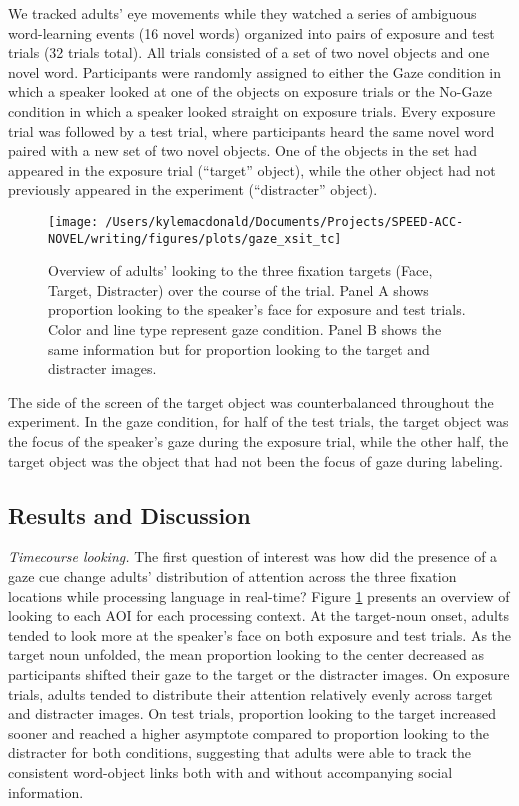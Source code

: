 \documentclass[oneside]{report}
\begin{document}
We tracked adults' eye movements while they watched a series of
ambiguous word-learning events (16 novel words) organized into pairs of
exposure and test trials (32 trials total). All trials consisted of a
set of two novel objects and one novel word. Participants were randomly
assigned to either the Gaze condition in which a speaker looked at one
of the objects on exposure trials or the No-Gaze condition in which a
speaker looked straight on exposure trials. Every exposure trial was
followed by a test trial, where participants heard the same novel word
paired with a new set of two novel objects. One of the objects in the
set had appeared in the exposure trial (``target'' object), while the
other object had not previously appeared in the experiment
(``distracter'' object).
\begin{figure}[!t]

{\centering \texttt{[image: /Users/kylemacdonald/Documents/Projects/SPEED-ACC-NOVEL/writing/figures/plots/gaze\_xsit\_tc]} 

}

\caption[Overview of looking behavior in Experiment 5.2.]{Overview of adults' looking to the three fixation targets (Face, Target, Distracter) over the course of the trial. Panel A shows proportion looking to the speaker's face for exposure and test trials. Color and line type represent gaze condition. Panel B shows the same information but for proportion looking to the target and distracter images.}\label{fig:gaze-xsit-tc-plot}
\end{figure}
The side of the screen of the target object was counterbalanced
throughout the experiment. In the gaze condition, for half of the test
trials, the target object was the focus of the speaker's gaze during the
exposure trial, while the other half, the target object was the object
that had not been the focus of gaze during labeling.

\subsection{Results and Discussion}\label{results-and-discussion-6}

\emph{Timecourse looking.} The first question of interest was how did
the presence of a gaze cue change adults' distribution of attention
across the three fixation locations while processing language in
real-time? Figure \ref{fig:gaze-xsit-tc-plot} presents an overview of
looking to each AOI for each processing context. At the target-noun
onset, adults tended to look more at the speaker's face on both exposure
and test trials. As the target noun unfolded, the mean proportion
looking to the center decreased as participants shifted their gaze to
the target or the distracter images. On exposure trials, adults tended
to distribute their attention relatively evenly across target and
distracter images. On test trials, proportion looking to the target
increased sooner and reached a higher asymptote compared to proportion
looking to the distracter for both conditions, suggesting that adults
were able to track the consistent word-object links both with and
without accompanying social information.
\end{document}
